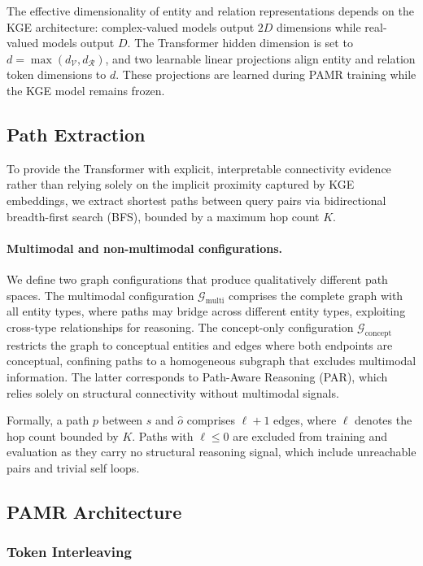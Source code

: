 \documentclass[runningheads]{llncs}
\begin{document}
The effective dimensionality of entity and relation representations
depends on the KGE architecture: complex-valued models output $2D$
dimensions while real-valued models output $D$. The Transformer
hidden dimension is set to $d = \max(d_{\mathcal{V}},
d_{\mathcal{R}})$, and two learnable linear projections align entity
and relation token dimensions to $d$. These
projections are learned during PAMR training while the KGE model
remains frozen.

\subsection{Path Extraction}
\label{sec:path-extraction}

To provide the Transformer with explicit, interpretable connectivity evidence rather than
relying solely on the implicit proximity captured by KGE embeddings, we extract shortest
paths between query pairs via bidirectional breadth-first search (BFS), bounded by a
maximum hop count $K$.

\paragraph{Multimodal and non-multimodal configurations.}
We define two graph configurations that produce qualitatively different path spaces.
The multimodal configuration $\mathcal{G}_{\text{multi}}$ comprises the complete
graph with all entity types, where paths may bridge across different entity types,
exploiting cross-type relationships for reasoning.  The concept-only configuration
$\mathcal{G}_{\text{concept}}$ restricts the graph to conceptual entities and
edges where both endpoints are conceptual, confining paths to a homogeneous
subgraph that excludes multimodal information.  The latter corresponds to
Path-Aware Reasoning (PAR), which relies solely on structural connectivity
without multimodal signals.

Formally, a path $p$ between $s$ and $\hat{o}$ comprises $\ell + 1$ edges, where
$\ell$ denotes the hop count bounded by $K$.
Paths with $\ell \leq 0$ are excluded from training and evaluation as they
carry no structural reasoning signal, which include unreachable pairs and
trivial self loops.

\subsection{PAMR Architecture}
\label{sec:pamr-architecture}

\subsubsection{Token Interleaving}
\label{sec:token-interleaving}
\end{document}
